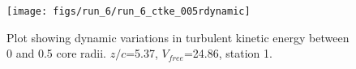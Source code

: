 \begin{figure}[H]
\centering
\texttt{[image: figs/run\_6/run\_6\_ctke\_005rdynamic]}
\caption{Plot showing dynamic variations in turbulent kinetic energy between 0 and 0.5 core radii. $z/c$=5.37, $V_{free}$=24.86, station 1.}
\label{fig:run_6_ctke_005rdynamic}
\end{figure}


